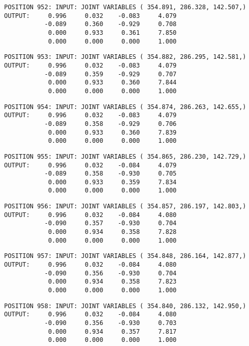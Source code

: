 \begin{verbatim}
POSITION 952: INPUT: JOINT VARIABLES ( 354.891, 286.328, 142.507,)
OUTPUT:     0.996     0.032    -0.083     4.079
           -0.089     0.360    -0.929     0.708
            0.000     0.933     0.361     7.850
            0.000     0.000     0.000     1.000
\end{verbatim} \pagebreak[1]\begin{verbatim}
POSITION 953: INPUT: JOINT VARIABLES ( 354.882, 286.295, 142.581,)
OUTPUT:     0.996     0.032    -0.083     4.079
           -0.089     0.359    -0.929     0.707
            0.000     0.933     0.360     7.844
            0.000     0.000     0.000     1.000
\end{verbatim} \pagebreak[1]\begin{verbatim}
POSITION 954: INPUT: JOINT VARIABLES ( 354.874, 286.263, 142.655,)
OUTPUT:     0.996     0.032    -0.083     4.079
           -0.089     0.358    -0.929     0.706
            0.000     0.933     0.360     7.839
            0.000     0.000     0.000     1.000
\end{verbatim} \pagebreak[1]\begin{verbatim}
POSITION 955: INPUT: JOINT VARIABLES ( 354.865, 286.230, 142.729,)
OUTPUT:     0.996     0.032    -0.084     4.079
           -0.089     0.358    -0.930     0.705
            0.000     0.933     0.359     7.834
            0.000     0.000     0.000     1.000
\end{verbatim} \pagebreak[1]\begin{verbatim}
POSITION 956: INPUT: JOINT VARIABLES ( 354.857, 286.197, 142.803,)
OUTPUT:     0.996     0.032    -0.084     4.080
           -0.090     0.357    -0.930     0.704
            0.000     0.934     0.358     7.828
            0.000     0.000     0.000     1.000
\end{verbatim} \pagebreak[1]\begin{verbatim}
POSITION 957: INPUT: JOINT VARIABLES ( 354.848, 286.164, 142.877,)
OUTPUT:     0.996     0.032    -0.084     4.080
           -0.090     0.356    -0.930     0.704
            0.000     0.934     0.358     7.823
            0.000     0.000     0.000     1.000
\end{verbatim} \pagebreak[1]\begin{verbatim}
POSITION 958: INPUT: JOINT VARIABLES ( 354.840, 286.132, 142.950,)
OUTPUT:     0.996     0.032    -0.084     4.080
           -0.090     0.356    -0.930     0.703
            0.000     0.934     0.357     7.817
            0.000     0.000     0.000     1.000
\end{verbatim} \pagebreak[1]\begin{verbatim}

\end{verbatim}
